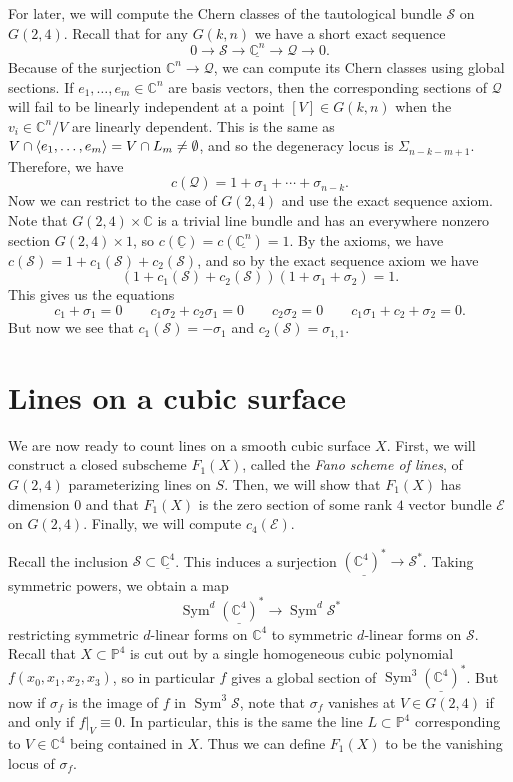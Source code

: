 \documentclass{amsart}
\theoremstyle{definition}
\theoremstyle{remark}
\theoremstyle{plain}
\theoremstyle{definition}
\theoremstyle{remark}
\newcommand{\C}{\mathbb{C}}
\renewcommand{\P}{\mathbb{P}}
\newcommand{\mc}[1]{\mathcal{#1}}
\newcommand{\on}[1]{\operatorname{#1}}
\newcommand{\ul}[1]{\underline{#1}}
\newcommand{\1}{\mathbf{1}}
\newcommand{\2}{\mathbf{2}}
\newcommand{\3}{\mathbf{3}}
\begin{document}
For later, we will compute the Chern classes of the tautological bundle $\mc{S}$ on $G(2, 4)$. Recall that for any $G(k,n)$ we have a short exact sequence
\[ 0 \to \mc{S} \to \ul{\C^n} \to \mc{Q} \to 0. \]
Because of the surjection $\C^n \to \mc{Q}$, we can compute its Chern classes using global sections. If $e_1, \ldots, e_m \in \C^n$ are basis vectors, then the corresponding sections of $\mc{Q}$ will fail to be linearly independent at a point $[V] \in G(k,n)$ when the $v_i \in \C^n/V$ are linearly dependent. This is the same as $V \cap \ev{e_1, \ldots, e_m} = V \cap L_m \neq \emptyset$, and so the degeneracy locus is $\Sigma_{n-k-m+1}$. Therefore, we have
\[ c(\mc{Q}) = 1 + \sigma_1 + \cdots + \sigma_{n-k}. \]
Now we can restrict to the case of $G(2,4)$ and use the exact sequence axiom. Note that $G(2,4) \times \C$ is a trivial line bundle and has an everywhere nonzero section $G(2,4) \times \qty{1}$, so $c(\ul{\C}) = c(\ul{\C^n}) = 1$. By the axioms, we have $c(\mc{S}) = 1 + c_1(\mc{S}) + c_2(\mc{S})$, and so by the exact sequence axiom we have
\[ (1 + c_1(\mc{S}) + c_2(\mc{S}))(1 + \sigma_1 + \sigma_2) = 1. \]
This gives us the equations
\[ c_1 + \sigma_1 = 0 \qquad c_1\sigma_2 + c_2 \sigma_1 = 0 \qquad c_2 \sigma_2 = 0 \qquad c_1 \sigma_1 + c_2 + \sigma_2 = 0. \]
But now we see that $c_1(\mc{S}) = -\sigma_1$ and $c_2(\mc{S}) = \sigma_{1,1}$.

\section{Lines on a cubic surface}

We are now ready to count lines on a smooth cubic surface $X$. First, we will construct a closed subscheme $F_1(X)$, called the \textit{Fano scheme of lines}, of $G(2,4)$ parameterizing lines on $S$. Then, we will show that $F_1(X)$ has dimension $0$ and that $F_1(X)$ is the zero section of some rank $4$ vector bundle $\mc{E}$ on $G(2,4)$. Finally, we will compute $c_4(\mc{E})$.

Recall the inclusion $\mc{S} \subset \ul{\C^4}$. This induces a surjection $\ul{(\C^4)^*} \to \mc{S}^*$. Taking symmetric powers, we obtain a map
\[ \on{Sym}^d \ul{(\C^4)}^* \to \on{Sym}^d \mc{S}^* \]
restricting symmetric $d$-linear forms on $\C^4$ to symmetric $d$-linear forms on $\mc{S}$. Recall that $X \subset \P^4$ is cut out by a single homogeneous cubic polynomial $f(x_0, x_1, x_2, x_3)$, so in particular $f$ gives a global section of $\on{Sym}^3 \ul{(\C^4)}^*$. But now if $\sigma_{f}$ is the image of $f$ in $\on{Sym}^3 \mc{S}$, note that $\sigma_f$ vanishes at $V \in G(2,4)$ if and only if $f |_V \equiv 0$. In particular, this is the same the line $L \subset \P^4$ corresponding to $V \in \C^4$ being contained in $X$. Thus we can define $F_1(X)$ to be the vanishing locus of $\sigma_f$.
\end{document}
